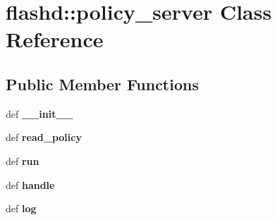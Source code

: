 \hypertarget{classflashd_1_1policy__server}{
\section{flashd::policy\_\-server Class Reference}
\label{classflashd_1_1policy__server}
}
\subsection*{Public Member Functions}
\begin{DoxyCompactItemize}
\item 
\hypertarget{classflashd_1_1policy__server_a5ed7724247e765d943ea71838edd4f16}{
def {\bfseries \_\-\_\-init\_\-\_\-}}
\label{classflashd_1_1policy__server_a5ed7724247e765d943ea71838edd4f16}

\item 
\hypertarget{classflashd_1_1policy__server_aacf4df89a3c1304563c66c70314a2427}{
def {\bfseries read\_\-policy}}
\label{classflashd_1_1policy__server_aacf4df89a3c1304563c66c70314a2427}

\item 
\hypertarget{classflashd_1_1policy__server_a56e516d65be4858e24ad2266d8bf5f13}{
def {\bfseries run}}
\label{classflashd_1_1policy__server_a56e516d65be4858e24ad2266d8bf5f13}

\item 
\hypertarget{classflashd_1_1policy__server_ad65c995167602ddeb034e697d835b7ec}{
def {\bfseries handle}}
\label{classflashd_1_1policy__server_ad65c995167602ddeb034e697d835b7ec}

\item 
\hypertarget{classflashd_1_1policy__server_afe100e5ad238c9958c9254542ba7331d}{
def {\bfseries log}}
\label{classflashd_1_1policy__server_afe100e5ad238c9958c9254542ba7331d}

\end{DoxyCompactItemize}
